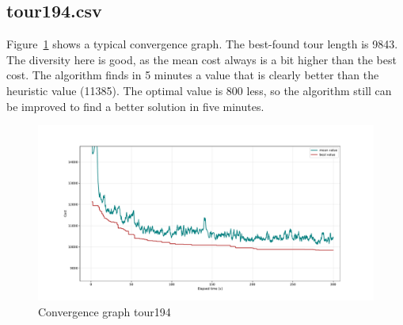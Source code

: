 \documentclass[a4paper,10pt]{article}
\newcommand{\ReplaceMe}[1]{{\color{blue}#1}}
\begin{document}
\subsection{tour194.csv}



Figure~\ref{fig:convergence194} shows a typical convergence graph. The best-found tour length is 9843. The diversity here is good, as the mean cost always is a bit higher than the best cost. The algorithm finds in 5 minutes a value that is clearly better than the heuristic value (11385). The optimal value is 800 less, so the algorithm still can be improved to find a better solution in five minutes. 
\begin{figure}[H]
  \centering
  \includegraphics[width=.8\linewidth]{img/convergence194.pdf}
  \caption{Convergence graph tour194}
  \label{fig:convergence194}
\end{figure}
\end{document}
